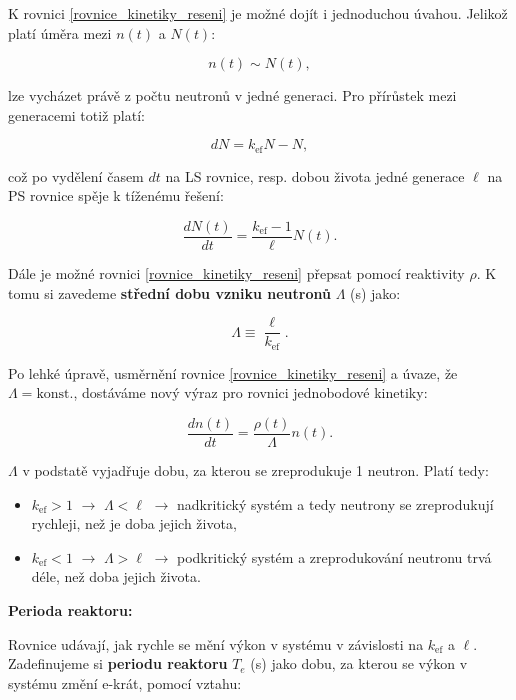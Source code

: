 K rovnici \eqref{rovnice_kinetiky_reseni} je možné dojít i jednoduchou úvahou. Jelikož platí úměra mezi $n(t)$ a $N(t)$:

$$ n(t) \sim N(t), $$

lze vycházet právě z počtu neutronů v jedné generaci. Pro přírůstek mezi generacemi totiž platí:

$$ dN = k_{\text{ef}}N - N, $$

což po vydělení časem $dt$ na LS rovnice, resp. dobou života jedné generace $\ell$ na PS rovnice spěje k tíženému řešení:

$$ \dfrac{dN(t)}{dt} = \dfrac{k_{\text{ef}} - 1}{\ell} N(t). $$

Dále je možné rovnici \eqref{rovnice_kinetiky_reseni} přepsat pomocí reaktivity $\rho$. K tomu si zavedeme \textbf{střední dobu vzniku neutronů} $\Lambda$ (s) jako:

\begin{equation}
  \boxed{
  \Lambda \equiv \dfrac{\ell}{k_{\text{ef}}}.
  \label{stredni_doba_vzniku}}
\end{equation}

Po lehké úpravě, usměrnění rovnice \eqref{rovnice_kinetiky_reseni} a úvaze, že $\Lambda = \text{konst.}$, dostáváme nový výraz pro rovnici jednobodové kinetiky:

\begin{equation}
  \boxed{
  \dfrac{dn(t)}{dt} = \dfrac{\rho (t)}{\Lambda} n(t).
  \label{rovnice_kinetiky_reaktivita}}
\end{equation}

$\Lambda$ v podstatě vyjadřuje dobu, za kterou se zreprodukuje 1 neutron. Platí tedy:

\begin{itemize}
  \item $k_{\text{ef}} > 1$ $\rightarrow$ $\Lambda < \ell$ $\rightarrow$ nadkritický systém a tedy neutrony se zreprodukují rychleji, než je doba jejich života,
  \item $k_{\text{ef}} < 1$ $\rightarrow$ $\Lambda > \ell$ $\rightarrow$ podkritický systém a zreprodukování neutronu trvá déle, než doba jejich života.
\end{itemize}

\textbf{Perioda reaktoru:}

Rovnice udávají, jak rychle se mění výkon v systému v závislosti na $k_{\text{ef}}$ a $\ell$. Zadefinujeme si \textbf{periodu reaktoru} $T_e$ (s) jako dobu, za kterou se výkon v systému změní e-krát, pomocí vztahu:

